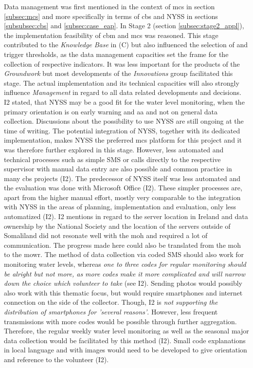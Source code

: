 Data management was first mentioned in the context of \acrlong{mcs} in section \ref{subsec:mcs} and more specifically in terms of \acrlong{cbs} and NYSS in sections \ref{subsubsec:cbs} and \ref{subsec:case_eap}. In Stage 2 (section \ref{subsec:stage2_appl}), the implementation feasibility of \acrshort{cbm} and \acrshort{mcs} was reasoned.\newline
This stage contributed to the \textit{Knowledge Base} in (C) but also influenced the selection of  and trigger thresholds, as the data management capacities set the frame for the collection of respective indicators. It was less important for the products of the \textit{Groundwork} but most developments of the \textit{Innovations} group facilitated this stage. The actual implementation and its technical capacities will also strongly influence \textit{Management} in regard to all data related developments and decisions.\newline
I2 stated, that NYSS may be a good fit for the water level monitoring, when the primary orientation is on early warning and \acrlong{aa} and not on general data collection. Discussions about the possibility to use NYSS are still ongoing at the time of writing. The potential integration of NYSS, together with its dedicated implementation, makes NYSS the preferred \acrshort{mcs} platform for this project and it was therefore further explored in this stage. However, less automated and technical processes such as simple SMS or calls directly to the respective supervisor with manual data entry are also possible and common practice in many \acrshort{cbs} projects (I2). The predecessor of NYSS itself was less automated and the evaluation was done with Microsoft Office (I2). These simpler processes are, apart from the higher manual effort, mostly very comparable to the integration with NYSS in the areas of planning, implementation and evaluation, only less automatized (I2).\newline
I2 mentions in regard to the server location in Ireland and data ownership by the National Society and the location of the servers outside of Somaliland did not resonate well with the \acrshort{moh} and required a lot of communication. The progress made here could also be translated from the \acrshort{moh} to the \acrshort{mowr}.\newline
The method of data collection via coded SMS should also work for monitoring water levels, whereas \textit{one to three codes for regular monitoring should be alright but not more, as more codes make it more complicated and will narrow down the choice which volunteer to take} (see I2). Sending photos would possibly also work with this thematic focus, but would require smartphones and internet connection on the side of the collector. Though, I2 is \textit{not supporting the distribution of smartphones for 'several reasons'}. However, less frequent transmissions with more codes would be possible through further aggregation. Therefore, the regular weekly water level monitoring as well as the seasonal major data collection would be facilitated by this method (I2). Small code explanations in local language and with images would need to be developed to give orientation and reference to the volunteer (I2). \newline
